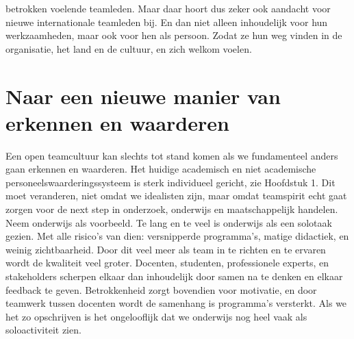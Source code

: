 \documentclass[empirical, authordate, ]{new-jote-article}
\begin{document}
betrokken voelende teamleden. Maar daar hoort dus zeker ook aandacht voor nieuwe internationale teamleden bij. En dan niet alleen inhoudelijk voor hun werkzaamheden, maar ook voor hen als persoon. Zodat ze hun weg vinden in de organisatie, het land en de cultuur, en zich welkom voelen.



	\section{Naar een nieuwe manier van erkennen en waarderen}



	Een open teamcultuur kan slechts tot stand komen als we fundamenteel anders gaan erkennen en waarderen. Het huidige academisch en niet academische personeelswaarderingssysteem is sterk individueel gericht, zie Hoofdstuk 1. Dit moet veranderen, niet omdat we idealisten zijn, maar omdat teamspirit echt gaat zorgen voor de next step in onderzoek, onderwijs en maatschappelijk handelen. Neem onderwijs als voorbeeld. Te lang en te veel is onderwijs als een solotaak gezien. Met alle risico's van dien: versnipperde programma's, matige didactiek, en weinig zichtbaarheid. Door dit veel meer als team in te richten en te ervaren wordt de kwaliteit veel groter. Docenten, studenten, professionele experts, en stakeholders scherpen elkaar dan inhoudelijk door samen na te denken en elkaar feedback te geven. Betrokkenheid zorgt bovendien voor motivatie, en door teamwerk tussen docenten wordt de samenhang is programma's versterkt. Als we het zo opschrijven is het ongelooflijk dat we onderwijs nog heel vaak als soloactiviteit zien.
\end{document}
